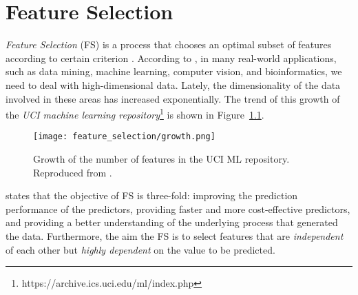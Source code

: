 \chapter{Feature Selection}
\label{ch:feature-selection}

\textit{Feature Selection} (FS) is a process that chooses an optimal subset of features according to certain criterion \citep{liu2012feature}. According to \citet{sammut2017encyclopedia}, in many real-world applications, such as data mining, machine learning, computer vision, and bioinformatics, we need to deal with high-dimensional data. Lately, the dimensionality of the data involved in these areas has increased exponentially. The trend of this growth of the \textit{UCI machine learning repository}\footnote{https://archive.ics.uci.edu/ml/index.php} is shown in Figure~\ref{fig:fs_growth}.

\begin{figure}
  \texttt{[image: feature\_selection/growth.png]}
  \caption{Growth of the number of features in the UCI ML repository. Reproduced from \citet{sammut2017encyclopedia}.}
  \label{fig:fs_growth}
\end{figure}

\citet{guyon2003introduction} states that the objective of FS is three-fold: improving the prediction performance of the predictors, providing faster and more cost-effective predictors, and providing a better understanding of the underlying process that generated the data. Furthermore, the aim the FS is to select features that are \textit{independent} of each other but \textit{highly dependent} on the value to be predicted.


